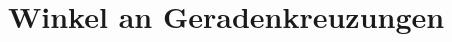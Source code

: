 \renewcommand{\subdir}{WinkelAnGeradenkreuzungen/}

\ifproblem
\section{Winkel an Geradenkreuzungen}
\fi


